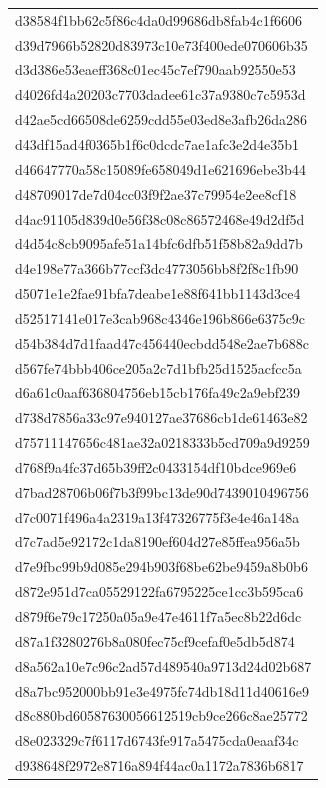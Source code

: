 \begin{tabular}{l}
d38584f1bb62c5f86c4da0d99686db8fab4c1f6606 \\
d39d7966b52820d83973c10e73f400ede070606b35 \\
d3d386e53eaeff368c01ec45c7ef790aab92550e53 \\
d4026fd4a20203c7703dadee61c37a9380c7c5953d \\
d42ae5cd66508de6259cdd55e03ed8e3afb26da286 \\
d43df15ad4f0365b1f6c0dcdc7ae1afc3e2d4e35b1 \\
d46647770a58c15089fe658049d1e621696ebe3b44 \\
d48709017de7d04cc03f9f2ae37c79954e2ee8cf18 \\
d4ac91105d839d0e56f38c08c86572468e49d2df5d \\
d4d54c8cb9095afe51a14bfc6dfb51f58b82a9dd7b \\
d4e198e77a366b77ccf3dc4773056bb8f2f8c1fb90 \\
d5071e1e2fae91bfa7deabe1e88f641bb1143d3ce4 \\
d52517141e017e3cab968c4346e196b866e6375c9c \\
d54b384d7d1faad47c456440ecbdd548e2ae7b688c \\
d567fe74bbb406ce205a2c7d1bfb25d1525acfcc5a \\
d6a61c0aaf636804756eb15cb176fa49c2a9ebf239 \\
d738d7856a33c97e940127ae37686cb1de61463e82 \\
d75711147656c481ae32a0218333b5cd709a9d9259 \\
d768f9a4fc37d65b39ff2c0433154df10bdce969e6 \\
d7bad28706b06f7b3f99bc13de90d7439010496756 \\
d7c0071f496a4a2319a13f47326775f3e4e46a148a \\
d7c7ad5e92172c1da8190ef604d27e85ffea956a5b \\
d7e9fbc99b9d085e294b903f68be62be9459a8b0b6 \\
d872e951d7ca05529122fa6795225ce1cc3b595ca6 \\
d879f6e79c17250a05a9e47e4611f7a5ec8b22d6dc \\
d87a1f3280276b8a080fec75cf9cefaf0e5db5d874 \\
d8a562a10e7c96c2ad57d489540a9713d24d02b687 \\
d8a7bc952000bb91e3e4975fc74db18d11d40616e9 \\
d8c880bd60587630056612519cb9ce266c8ae25772 \\
d8e023329c7f6117d6743fe917a5475cda0eaaf34c \\
d938648f2972e8716a894f44ac0a1172a7836b6817 \\

\end{tabular}
